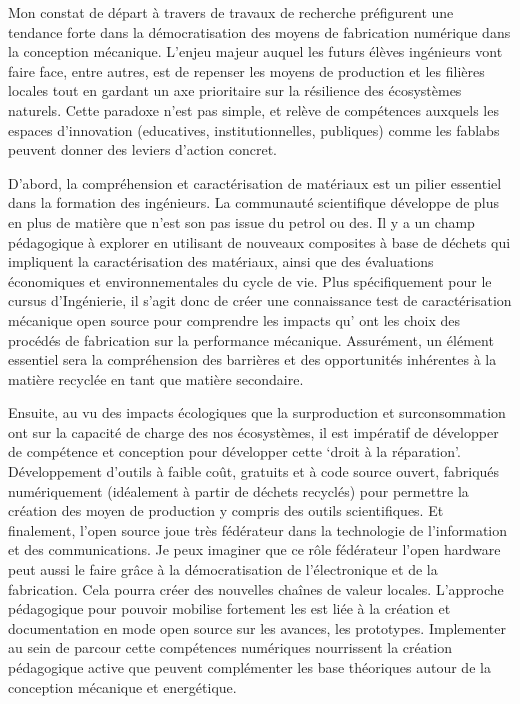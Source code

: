 \documentclass[
  12pt,
  oneside]{book}
\begin{document}
Mon constat de départ à travers de travaux de recherche préfigurent une tendance forte dans la démocratisation des moyens de fabrication numérique dans la conception mécanique. L'enjeu majeur auquel les futurs élèves ingénieurs vont faire face, entre autres, est de repenser les moyens de production et les filières locales tout en gardant un axe prioritaire sur la résilience des écosystèmes naturels. Cette paradoxe n'est pas simple, et relève de compétences auxquels les espaces d'innovation (educatives, institutionnelles, publiques) comme les fablabs peuvent donner des leviers d'action concret.

D'abord, la compréhension et caractérisation de matériaux est un pilier essentiel dans la formation des ingénieurs. La communauté scientifique développe de plus en plus de matière que n'est son pas issue du petrol ou des. Il y a un champ pédagogique à explorer en utilisant de nouveaux composites à base de déchets qui impliquent la caractérisation des matériaux, ainsi que des évaluations économiques et environnementales du cycle de vie.
Plus spécifiquement pour le cursus d'Ingénierie, il s'agit donc de créer une connaissance test de caractérisation mécanique open source pour comprendre les impacts qu' ont les choix des procédés de fabrication sur la performance mécanique. Assurément, un élément essentiel sera la compréhension des barrières et des opportunités inhérentes à la matière recyclée en tant que matière secondaire.

Ensuite, au vu des impacts écologiques que la surproduction et surconsommation ont sur la capacité de charge des nos écosystèmes, il est impératif de développer de compétence et conception pour développer cette `droit à la réparation'. Développement d'outils à faible coût, gratuits et à code source ouvert, fabriqués numériquement (idéalement à partir de déchets recyclés) pour permettre la création des moyen de production y compris des outils scientifiques.
Et finalement, l'open source joue très fédérateur dans la technologie de l'information et des communications. Je peux imaginer que ce rôle fédérateur l'open hardware peut aussi le faire grâce à la démocratisation de l'électronique et de la fabrication. Cela pourra créer des nouvelles chaînes de valeur locales. L'approche pédagogique pour pouvoir mobilise fortement les est liée à la création et documentation en mode open source sur les avances, les prototypes. Implementer au sein de parcour cette compétences numériques nourrissent la création pédagogique active que peuvent complémenter les base théoriques autour de la conception mécanique et energétique.
\end{document}
